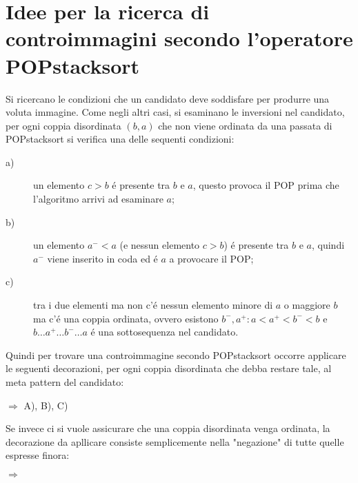 \section*{Idee per la ricerca di controimmagini secondo l'operatore POPstacksort}
Si ricercano le condizioni che un candidato deve soddisfare per produrre una voluta immagine. Come negli altri casi, si esaminano le inversioni nel candidato, per ogni coppia disordinata $(b,a)$ che non viene ordinata da una passata di POPstacksort si verifica una delle sequenti condizioni:
\begin{description}
	\item[a)] un elemento $c>b$ \'e presente tra $b$ e $a$, questo provoca il POP prima che l'algoritmo arrivi ad esaminare $a$;
	\item[b)] un elemento $a^-<a$ (e nessun elemento $c>b$) \'e presente tra $b$ e $a$, quindi $a^-$ viene inserito in coda ed \'e $a$ a provocare il POP;
	\item[c)] tra i due elementi ma non c'\'e nessun elemento minore di $a$ o maggiore $b$ ma c'\'e una coppia ordinata, ovvero esistono ${b^-,a^+}:a<a^+<b^-<b$ e $b\dots{a^+}\dots{b^-}\dots{a}$ \'e una sottosequenza nel candidato.
\end{description}
Quindi per trovare una controimmagine secondo POPstacksort occorre applicare le seguenti decorazioni, per ogni coppia disordinata che debba restare tale, al meta pattern del candidato:
\begin{center}
$\Rightarrow$
A),
B),
C)
\end{center}
Se invece ci si vuole assicurare che una coppia disordinata venga ordinata, la decorazione da apllicare consiste semplicemente nella "negazione" di tutte quelle espresse finora:
\begin{center}
$\Rightarrow$
\end{center}
